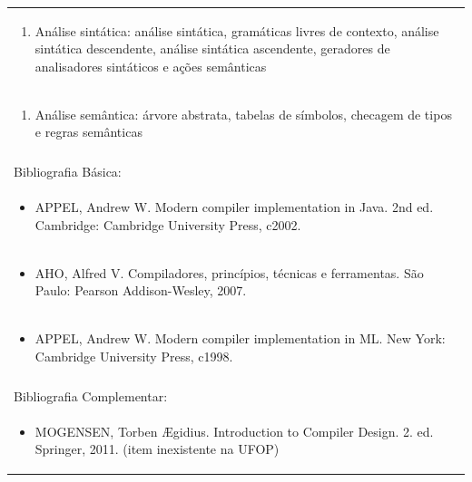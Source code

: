 \documentclass[11pt]{article}
\begin{document}
\begin{center}
\begin{longtable}{|p{4cm}|p{4cm}|p{4cm}|p{4cm}|}
\multicolumn{4}{|p{\dimexpr 16cm + 6\tabcolsep\relax}|}{\begin{enumerate}[start=3]\item Análise sintática: análise sintática, gramáticas livres de contexto, análise sintática descendente, análise sintática ascendente, geradores de analisadores sintáticos e ações semânticas\end{enumerate}}\\
\multicolumn{4}{|p{\dimexpr 16cm + 6\tabcolsep\relax}|}{\begin{enumerate}[start=4]\item Análise semântica: árvore abstrata, tabelas de símbolos, checagem de tipos e regras semânticas\end{enumerate}}\\
\multicolumn{4}{|p{\dimexpr 16cm + 6\tabcolsep\relax}|}{}\\
\hline
\multicolumn{4}{|p{16cm}|}{Bibliografia Básica:}\\*
\multicolumn{4}{|p{\dimexpr 16cm + 6\tabcolsep\relax}|}{\begin{itemize}\item APPEL, Andrew W. Modern compiler implementation in Java. 2nd ed. Cambridge: Cambridge University Press, c2002.\end{itemize}}\\
\multicolumn{4}{|p{\dimexpr 16cm + 6\tabcolsep\relax}|}{\begin{itemize}\item AHO, Alfred V. Compiladores, princípios, técnicas e ferramentas. São Paulo: Pearson Addison-Wesley, 2007.\end{itemize}}\\
\multicolumn{4}{|p{\dimexpr 16cm + 6\tabcolsep\relax}|}{\begin{itemize}\item APPEL, Andrew W. Modern compiler implementation in ML. New York: Cambridge University Press, c1998.\end{itemize}}\\
\multicolumn{4}{|p{16cm}|}{}\\
\hline
\multicolumn{4}{|p{16cm}|}{Bibliografia Complementar:}\\*
\multicolumn{4}{|p{\dimexpr 16cm + 6\tabcolsep\relax}|}{\begin{itemize}\item MOGENSEN, Torben Ægidius. Introduction to Compiler Design. 2. ed. Springer, 2011. (item inexistente na UFOP)\end{itemize}}\\

\end{longtable}
\end{center}
\end{document}
